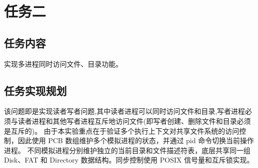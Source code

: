 \section{任务二}
\subsection{任务内容}
实现多进程同时访问文件、目录功能。
\subsection{任务实现规划}
该问题即是实现读者写者问题,其中读者进程可以同时访问文件和目录,写者进程必须与读者进程和其他写者进程互斥地访问文件(即写者创建、删除文件和目录必须是互斥的)。
由于本实验重点在于验证多个执行上下文对共享文件系统的访问控制，因此使用 PCB 数组维护多个模拟进程的状态，并通过 pid 命令切换当前操作进程。
不同模拟进程分别维护独立的当前目录和文件描述符表，底层共享同一组 Disk、FAT 和 Directory 数据结构。同步控制使用 POSIX 信号量和互斥锁实现。








